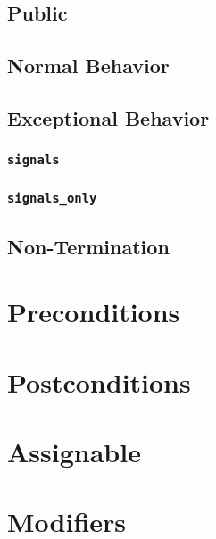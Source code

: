 \documentclass[a4paper, 11pt, accentcolor = tud3b]{tudreport}
\begin{document}
			\subsection{Public} %

			\subsection{Normal Behavior} %

			\subsection{Exceptional Behavior} %

				\subsubsection{\texttt{signals}} %

				\subsubsection{\texttt{signals\_only} } %

			\subsection{Non-Termination} %

		\section{Preconditions} %

		\section{Postconditions} %

		\section{Assignable} %

		\section{Modifiers} %
\end{document}
